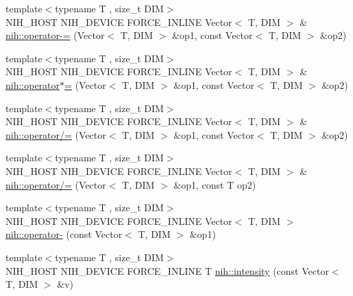 \begin{DoxyCompactItemize}
\item 
{\footnotesize template$<$typename T , size\-\_\-t \-D\-I\-M$>$ }\\\-N\-I\-H\-\_\-\-H\-O\-S\-T \-N\-I\-H\-\_\-\-D\-E\-V\-I\-C\-E \*
\-F\-O\-R\-C\-E\-\_\-\-I\-N\-L\-I\-N\-E \-Vector$<$ \-T, \-D\-I\-M $>$ \& \hyperlink{group__vectors_ga6c534bcb2f6acc627ea0988b2de4f73e}{nih\-::operator-\/=} (\-Vector$<$ \-T, \-D\-I\-M $>$ \&op1, const \-Vector$<$ \-T, \-D\-I\-M $>$ \&op2)
\item 
{\footnotesize template$<$typename T , size\-\_\-t \-D\-I\-M$>$ }\\\-N\-I\-H\-\_\-\-H\-O\-S\-T \-N\-I\-H\-\_\-\-D\-E\-V\-I\-C\-E \*
\-F\-O\-R\-C\-E\-\_\-\-I\-N\-L\-I\-N\-E \-Vector$<$ \-T, \-D\-I\-M $>$ \& \hyperlink{group__vectors_ga9719feff779258b2681dc8e81ee1a592}{nih\-::operator$\ast$=} (\-Vector$<$ \-T, \-D\-I\-M $>$ \&op1, const \-Vector$<$ \-T, \-D\-I\-M $>$ \&op2)
\item 
{\footnotesize template$<$typename T , size\-\_\-t \-D\-I\-M$>$ }\\\-N\-I\-H\-\_\-\-H\-O\-S\-T \-N\-I\-H\-\_\-\-D\-E\-V\-I\-C\-E \*
\-F\-O\-R\-C\-E\-\_\-\-I\-N\-L\-I\-N\-E \-Vector$<$ \-T, \-D\-I\-M $>$ \& \hyperlink{group__vectors_ga04e63000d70a03c13098b6b7303a29e9}{nih\-::operator/=} (\-Vector$<$ \-T, \-D\-I\-M $>$ \&op1, const \-Vector$<$ \-T, \-D\-I\-M $>$ \&op2)
\item 
{\footnotesize template$<$typename T , size\-\_\-t \-D\-I\-M$>$ }\\\-N\-I\-H\-\_\-\-H\-O\-S\-T \-N\-I\-H\-\_\-\-D\-E\-V\-I\-C\-E \*
\-F\-O\-R\-C\-E\-\_\-\-I\-N\-L\-I\-N\-E \-Vector$<$ \-T, \-D\-I\-M $>$ \& \hyperlink{group__vectors_gabcfc0bf4057eca196b46247e7294a526}{nih\-::operator/=} (\-Vector$<$ \-T, \-D\-I\-M $>$ \&op1, const \-T op2)
\item 
{\footnotesize template$<$typename T , size\-\_\-t \-D\-I\-M$>$ }\\\-N\-I\-H\-\_\-\-H\-O\-S\-T \-N\-I\-H\-\_\-\-D\-E\-V\-I\-C\-E \*
\-F\-O\-R\-C\-E\-\_\-\-I\-N\-L\-I\-N\-E \-Vector$<$ \-T, \-D\-I\-M $>$ \hyperlink{group__vectors_ga0f199097d81599a09c0607600e63b26a}{nih\-::operator-\/} (const \-Vector$<$ \-T, \-D\-I\-M $>$ \&op1)
\item 
{\footnotesize template$<$typename T , size\-\_\-t \-D\-I\-M$>$ }\\\-N\-I\-H\-\_\-\-H\-O\-S\-T \-N\-I\-H\-\_\-\-D\-E\-V\-I\-C\-E \-F\-O\-R\-C\-E\-\_\-\-I\-N\-L\-I\-N\-E \-T \hyperlink{group__vectors_ga0de5bc91fec52d0b92e059ebf5d389ec}{nih\-::intensity} (const \-Vector$<$ \-T, \-D\-I\-M $>$ \&v)

\end{DoxyCompactItemize}
